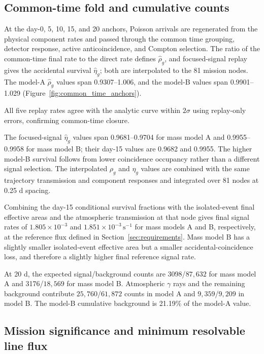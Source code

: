 \documentclass[11pt]{article}
\newcommand{\cps}{\ensuremath{\,\mathrm{s^{-1}}}}
\begin{document}
\FloatBarrier

\subsection{Common-time fold and cumulative counts}
\label{subsec:mission_fold_validation}

At the day-0, 5, 10, 15, and 20 anchors, Poisson arrivals are regenerated from the physical component rates and passed through the common time grouping, detector response, active anticoincidence, and Compton selection. The ratio of the common-time final rate to the direct rate defines $\widehat\rho_g$, and focused-signal replay gives the accidental survival $\widehat\eta_g$; both are interpolated to the 81 mission nodes. The model-A $\widehat\rho_g$ values span 0.9307--1.006, and the model-B values span 0.9901--1.029 (Figure~\ref{fig:common_time_anchors}).

All five replay rates agree with the analytic curve within $2\sigma$ using
replay-only errors, confirming common-time closure.

The focused-signal $\widehat\eta_g$ values span 0.9681--0.9704 for mass model A and 0.9955--0.9958 for mass model B; their day-15 values are 0.9682 and 0.9955. The higher model-B survival follows from lower coincidence occupancy rather than a different signal selection. The interpolated $\rho_g$ and $\eta_g$ values are combined with the same trajectory transmission and component responses and integrated over 81 nodes at 0.25 d spacing.

Combining the day-15 conditional survival fractions with the isolated-event final effective areas and the atmospheric transmission at that node gives final signal rates of $1.805\times10^{-3}$ and $1.851\times10^{-3}\cps$ for mass models A and B, respectively, at the reference flux defined in Section~\ref{sec:requirements}. Mass model B has a slightly smaller isolated-event effective area but a smaller accidental-coincidence loss, and therefore a slightly higher final reference signal rate.

At 20 d, the expected signal/background counts are 3098/$87{,}632$ for mass
model A and 3176/$18{,}569$ for mass model B. Atmospheric $\gamma$ rays and the
remaining background contribute $25{,}760$/$61{,}872$ counts in model A and
$9{,}359$/$9{,}209$ in model B. The model-B cumulative background is 21.19\%
of the model-A value.

\subsection{Mission significance and minimum resolvable line flux}
\label{subsec:final_mission_performance}
\end{document}
